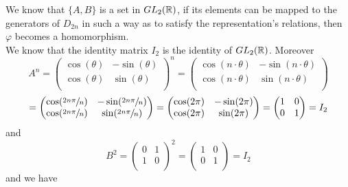 \documentclass[12pt]{article}
\begin{document}
\begin{enumerate}[label=\textbf{\alph*.}]
            We know that $\{A, B\}$ is a set in $GL_2(\mathbb{R})$,
            if its elements can be mapped to the generators of $D_{2n}$
            in such a way as to satisfy the representation's relations,
            then $\varphi$ becomes a homomorphism. \\ 
            We know that the identity matrix $I_2$ is the identity of
            $GL_2(\mathbb{R})$.
            Moreover
            \[ A^n = \begin{pmatrix}
                \cos(\theta) & -\sin(\theta) \\
                \cos(\theta) & \sin(\theta) \\
            \end{pmatrix}^n
            = \begin{pmatrix}
                \cos(n \cdot \theta) & -\sin(n \cdot \theta) \\
                \cos(n \cdot \theta) & \sin(n \cdot \theta) \\
            \end{pmatrix} \]
            \[ = \begin{pmatrix}
                \cos(\sfrac{2n \pi}{n}) & -\sin(\sfrac{2n \pi}{n}) \\
                \cos(\sfrac{2n \pi}{n}) & \sin(\sfrac{2n \pi}{n}) \\
            \end{pmatrix} 
             = \begin{pmatrix}
                \cos(2\pi) & -\sin(2\pi) \\
                \cos(2\pi) & \sin(2\pi) \\
            \end{pmatrix}
            = \begin{pmatrix}
                1 & 0 \\
                0 & 1 \\
            \end{pmatrix} = I_2 \]
            and
            \[ B^2 = \begin{pmatrix}
                0 & 1 \\
                1 & 0 \\
            \end{pmatrix}^2 
            =  \begin{pmatrix}
                1 & 0 \\
                0 & 1 \\
            \end{pmatrix} = I_2 \] 
            and we have

\end{enumerate}
\end{document}
